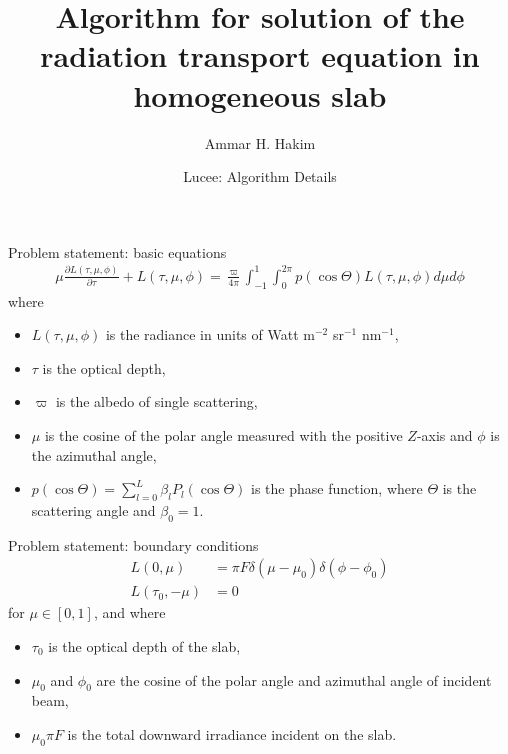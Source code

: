 \documentclass{beamer}
\title[RTE in homogeneous slab]{%
  Algorithm for solution of the radiation transport equation in homogeneous slab}
\author{Ammar H. Hakim}
\date[Lucee]
{Lucee: Algorithm Details}
\newcommand{\pfrac}[2]{\frac{\partial #1}{\partial #2}}
\begin{document}
\begin{frame}
  \titlepage
\end{frame}

\begin{frame}{Problem statement: basic equations}
  \begin{align}
    \mu\pfrac{L(\tau,\mu,\phi)}{\tau} + L(\tau,\mu,\phi)
    =
    \frac{\varpi}{4\pi}
    \int_{-1}^1 \int_0^{2\pi}
    p(\cos\Theta) L(\tau,\mu,\phi) d\mu d\phi
  \end{align}
  where
  \begin{itemize}
  \item $L(\tau,\mu,\phi)$ is the radiance in units of Watt m$^{-2}$
    sr$^{-1}$ nm$^{-1}$,
  \item $\tau$ is the optical depth,
  \item $\varpi$ is the albedo of single scattering,
  \item $\mu$ is the cosine of the polar angle measured with the
    positive $Z$-axis and $\phi$ is the azimuthal angle,
  \item $p(\cos\Theta) = \sum_{l=0}^L\beta_lP_l(\cos\Theta)$ is the
    phase function, where $\Theta$ is the scattering angle and
    $\beta_0=1$.
  \end{itemize}
\end{frame}

\begin{frame}{Problem statement: boundary conditions}
  \begin{align}
    L(0, \mu) &= \pi F \delta(\mu-\mu_0) \delta(\phi-\phi_0) \\
    L(\tau_0, -\mu) &= 0
  \end{align}
  for $\mu\in [0,1]$, and where
  \begin{itemize}
  \item $\tau_0$ is the optical depth of the slab,
  \item $\mu_0$ and $\phi_0$ are the cosine of the polar angle and
    azimuthal angle of incident beam,
  \item $\mu_0\pi F$ is the total downward irradiance incident on the
    slab.
  \end{itemize}
\end{frame}
\end{document}
